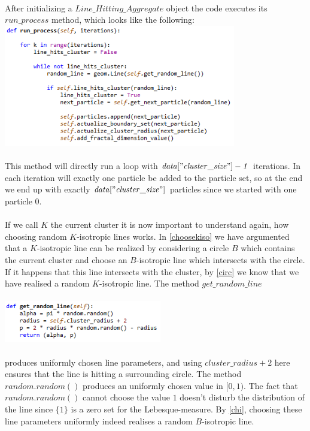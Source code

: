 \documentclass[12pt,a4paper]{scrartcl}
\numberwithin{equation}{subsection}
\newcommand{\1}{\mathbbm{1}}
\numberwithin{equation}{section}
\theoremstyle{definition}
\begin{document}
\\After initializing a $\mathit{Line\_Hitting\_Aggregate}$ object the code executes its $\mathit{run\_process}$ method, which looks like the following:
\\
\includegraphics[height=5.3cm]{images/code-snippets/runprocess.png} \\
\\
This method will directly run a loop with $\mathit{data["cluster\_size"] - 1}$ iterations. In each iteration will exactly one particle be added to the particle set, so at the end we end up with exactly $\mathit{data["cluster\_size"]}$ particles since we started with one particle 0. \\
\\If we call $K$ the current cluster it is now important to understand again, how choosing random $K$-isotropic lines works. In \ref{choosekiso} we have argumented that a $K$-isotropic line can be realized by considering a circle $B$ which contains the current cluster and choose an $B$-isotropic line which intersects with the circle. If it happens that this line intersects with the cluster, by \ref{circ} we know that we have realised a random $K$-isotropic line. The method $\mathit{get\_random\_line}$ \\
\\
\includegraphics[height=1.8cm]{images/code-snippets/randomline.png} \\
\\
produces uniformly chosen line parameters, and using $\mathit{cluster\_radius + 2}$ here ensures that the line is hitting a surrounding circle. The method $\mathit{random.random()}$ produces an uniformly chosen value in $[0,1)$. The fact that $\mathit{random.random()}$ cannot choose the value $1$ doesn't disturb the distribution of the line since $\{1\}$ is a zero set for the Lebesque-measure. By \ref{chi}, choosing these line parameters uniformly indeed realises a random $B$-isotropic line. \\
\end{document}
